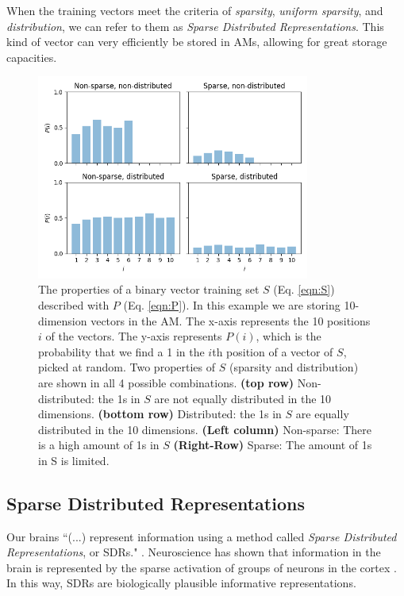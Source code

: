 \documentclass[runningheads]{llncs}
\begin{document}
When the training vectors meet the criteria of \textit{sparsity}, \textit{uniform sparsity}, and \textit{distribution}, we can refer to them as \textit{Sparse Distributed Representations}. This kind of vector can very efficiently be stored in AMs, allowing for great storage capacities.

\begin{figure}[h]
    \centering
    \includegraphics[width=0.8\textwidth]{img/sparse.png}
    \caption{The properties of a binary vector training set $S$ (Eq. \ref{eqn:S}) described with $P$ (Eq. \ref{eqn:P}). In this example we are storing 10-dimension vectors in the AM. The x-axis represents the 10 positions $i$ of the vectors. The y-axis represents $P(i)$, which is the probability that we find a 1 in the $i$th position of a vector of $S$, picked at random. Two properties of $S$ (sparsity and distribution) are shown in all 4 possible combinations. \textbf{(top row)} Non-distributed: the 1s in $S$ are not equally distributed in the 10 dimensions. \textbf{(bottom row)} Distributed: the 1s in $S$ are equally distributed in the 10 dimensions. \textbf{(Left column)} Non-sparse: There is a high amount of 1s in $S$ \textbf{(Right-Row)} Sparse: The amount of 1s in S is limited.}
    \label{fig:mesh1}
\label{fig:sparse}
\end{figure}
\subsection{Sparse Distributed Representations}
\label{sec:inputoutput_sdr}
Our brains ``(...) represent information using a method called \textit{Sparse Distributed Representations}, or SDRs." \cite{Hawkins-et-al-2016-Book}. Neuroscience has shown that information in the brain is represented by the sparse activation of groups of neurons in the cortex \cite{olshausen1996emergence}. In this way, SDRs are biologically plausible informative representations.
\end{document}
